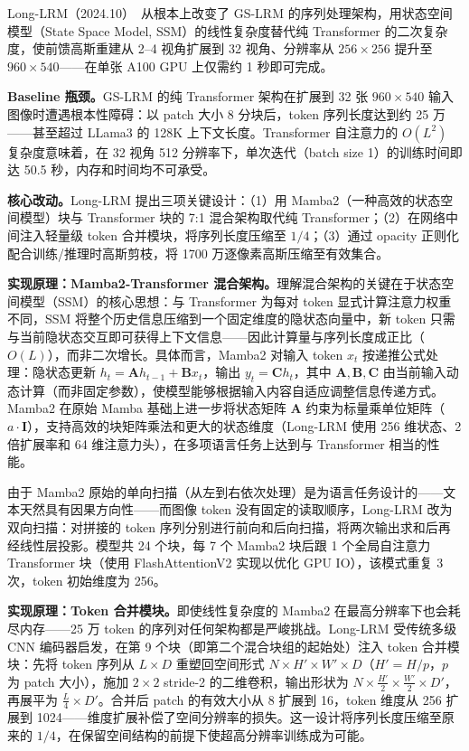 Long-LRM（2024.10）~\cite{2410_12781}从根本上改变了 GS-LRM 的序列处理架构，用状态空间模型（State Space Model, SSM）的线性复杂度替代纯 Transformer 的二次复杂度，使前馈高斯重建从 2--4 视角扩展到 32 视角、分辨率从 $256\times256$ 提升至 $960\times540$——在单张 A100 GPU 上仅需约 1 秒即可完成。

\textbf{Baseline 瓶颈。}GS-LRM 的纯 Transformer 架构在扩展到 32 张 $960\times540$ 输入图像时遭遇根本性障碍：以 patch 大小 8 分块后，token 序列长度达到约 25 万——甚至超过 LLama3 的 128K 上下文长度。Transformer 自注意力的 $O(L^2)$ 复杂度意味着，在 32 视角 512 分辨率下，单次迭代（batch size 1）的训练时间即达 50.5 秒，内存和时间均不可承受。

\textbf{核心改动。}Long-LRM 提出三项关键设计：（1）用 Mamba2（一种高效的状态空间模型）块与 Transformer 块的 7:1 混合架构取代纯 Transformer；（2）在网络中间注入轻量级 token 合并模块，将序列长度压缩至 $1/4$；（3）通过 opacity 正则化配合训练/推理时高斯剪枝，将 1700 万逐像素高斯压缩至有效集合。

\textbf{实现原理：Mamba2-Transformer 混合架构。}理解混合架构的关键在于状态空间模型（SSM）的核心思想：与 Transformer 为每对 token 显式计算注意力权重不同，SSM 将整个历史信息压缩到一个固定维度的隐状态向量中，新 token 只需与当前隐状态交互即可获得上下文信息——因此计算量与序列长度成正比（$O(L)$），而非二次增长。具体而言，Mamba2 对输入 token $x_t$ 按递推公式处理：隐状态更新 $h_t = \mathbf{A}h_{t-1} + \mathbf{B}x_t$，输出 $y_t = \mathbf{C}h_t$，其中 $\mathbf{A}, \mathbf{B}, \mathbf{C}$ 由当前输入动态计算（而非固定参数），使模型能够根据输入内容自适应调整信息传递方式。Mamba2 在原始 Mamba 基础上进一步将状态矩阵 $\mathbf{A}$ 约束为标量乘单位矩阵（$a \cdot \mathbf{I}$），支持高效的块矩阵乘法和更大的状态维度（Long-LRM 使用 256 维状态、2 倍扩展率和 64 维注意力头），在多项语言任务上达到与 Transformer 相当的性能。

由于 Mamba2 原始的单向扫描（从左到右依次处理）是为语言任务设计的——文本天然具有因果方向性——而图像 token 没有固定的读取顺序，Long-LRM 改为双向扫描：对拼接的 token 序列分别进行前向和后向扫描，将两次输出求和后再经线性层投影。模型共 24 个块，每 7 个 Mamba2 块后跟 1 个全局自注意力 Transformer 块（使用 FlashAttentionV2 实现以优化 GPU IO），该模式重复 3 次，token 初始维度为 256。

\textbf{实现原理：Token 合并模块。}即使线性复杂度的 Mamba2 在最高分辨率下也会耗尽内存——25 万 token 的序列对任何架构都是严峻挑战。Long-LRM 受传统多级 CNN 编码器启发，在第 9 个块（即第二个混合块组的起始处）注入 token 合并模块：先将 token 序列从 $L \times D$ 重塑回空间形式 $N \times H' \times W' \times D$（$H'=H/p$，$p$ 为 patch 大小），施加 $2\times 2$ stride-2 的二维卷积，输出形状为 $N \times \frac{H'}{2} \times \frac{W'}{2} \times D'$，再展平为 $\frac{L}{4} \times D'$。合并后 patch 的有效大小从 8 扩展到 16，token 维度从 256 扩展到 1024——维度扩展补偿了空间分辨率的损失。这一设计将序列长度压缩至原来的 $1/4$，在保留空间结构的前提下使超高分辨率训练成为可能。

